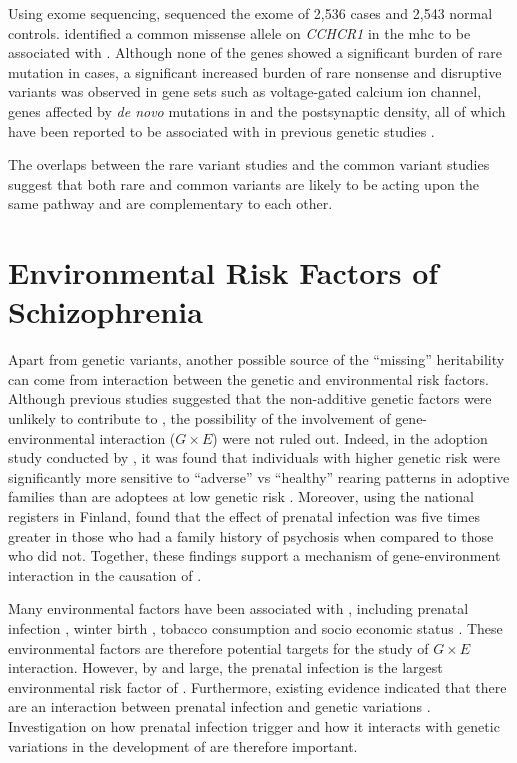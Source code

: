 	Using exome sequencing, \citet{Purcell2014} sequenced the exome of 2,536  cases and 2,543 normal controls. 
	\citet{Purcell2014} identified a common missense allele on \textit{CCHCR1} in the \gls{mhc} to be associated with .
	Although none of the genes showed a significant burden of rare mutation in  cases, a significant increased burden of rare nonsense and disruptive variants was observed in gene sets such as voltage-gated calcium ion channel, genes affected by \textit{de novo} mutations in  \citep{Fromer2014} and the postsynaptic density, all of which have been reported to be associated with  in previous genetic studies \citep{Ripke2014}.

	The overlaps between the rare variant studies and the common variant studies suggest that both rare and common variants are likely to be acting upon the same pathway and are complementary to each other.
	
	\section{Environmental Risk Factors of Schizophrenia}
	Apart from genetic variants, another possible source of the ``missing'' heritability can come from interaction between the genetic and environmental risk factors.
	Although previous studies \citep{Gottesman01071967} suggested that the non-additive genetic factors were unlikely to contribute to , the possibility of the involvement of gene-environmental interaction ($G\times E$) were not ruled out.
	Indeed, in the adoption study conducted by \citet{Tienari2004}, it was found that individuals with higher genetic risk were significantly more sensitive to ``adverse'' vs ``healthy'' rearing patterns in adoptive families than are adoptees at low genetic risk \citep{Tienari2004}.
	Moreover, using the national registers in Finland, \citet{Clarke2009} found that the effect of prenatal infection was five times greater in those who had a family history of psychosis when compared to those who did not. 
	Together, these findings support a mechanism of gene-environment interaction in the causation of .
	
	Many environmental factors have been associated with , including prenatal infection \citep{Brown2010}, winter birth \citep{o1991season}, tobacco consumption \citep{Kelly1999} and socio economic status \citep{McGrath2008a}.
	These environmental factors are therefore potential targets for the study of $G\times E$ interaction.
	However, by and large, the prenatal infection is the largest environmental risk factor of .
	Furthermore, existing evidence indicated that there are an interaction between prenatal infection and genetic variations \citep{Clarke2009}.
	Investigation on how prenatal infection trigger  and how it interacts with genetic variations in the development of  are therefore important.	
	
